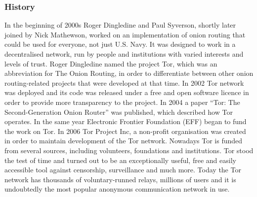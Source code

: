 \subsubsection{History}
In the beginning of 2000s Roger Dingledine and Paul Syverson, shortly later joined by Nick Mathewson, worked on an implementation of onion routing that could be used for everyone, not just U.S. Navy. It was designed to work in a decentralised network, run by people and institutions with varied interests and levels of trust. Roger Dingledine named the project Tor, which was an abbreviation for The Onion Routing, in order to differentiate between other onion routing-related projects that were developed at that time.
In 2002 Tor network was deployed and its code was released under a free and open software licence in order to provide more transparency to the project.
In 2004 a paper “Tor: The Second-Generation Onion Router” \cite{tor-design} was published, which described how Tor operates. In the same year Electronic Frontier Foundation (EFF) began to fund the work on Tor.
In 2006 Tor Project Inc, a non-profit organisation was created in order to maintain development of the Tor network. Nowadays Tor is funded from several sources, including volunteers, foundations and institutions.
Tor stood the test of time and turned out to be an exceptionally useful, free and easily accessible tool against censorship, surveillance and much more. Today the Tor network has thousands of voluntary-runned relays, millions of users and it is undoubtedly the most popular anonymous communication network in use.

